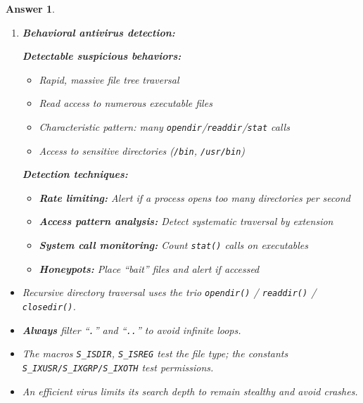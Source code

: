 \documentclass[a4paper,11pt]{article}
\theoremstyle{plain}
\newtheorem{correction}{Answer}
\theoremstyle{definition}
\begin{document}
\begin{correction}
\begin{enumerate}
\begin{lstlisting}[language=C]
        if (S_ISDIR(st.st_mode)) {
            // Increment depth for subdirectories
            search_targets(fullpath, ext, depth + 1, max_depth);
        } else if (S_ISREG(st.st_mode)) {
            char *e = strrchr(entry->d_name, '.');
            if (e && strcmp(e, ext) == 0) {
                printf("Target: %s\n", fullpath);
            }
        }
    }
    closedir(dir);
}

// Initial call with depth=0
search_targets("/home", ".c", 0, 3);  // Max 3 levels
\end{lstlisting}

\item \textbf{Behavioral antivirus detection:}

\textbf{Detectable suspicious behaviors:}
\begin{itemize}
\item Rapid, massive file tree traversal
\item Read access to numerous executable files
\item Characteristic pattern: many \texttt{opendir}/\texttt{readdir}/\texttt{stat} calls
\item Access to sensitive directories (\texttt{/bin}, \texttt{/usr/bin})
\end{itemize}

\textbf{Detection techniques:}
\begin{itemize}
\item \textbf{Rate limiting:} Alert if a process opens too many directories per second
\item \textbf{Access pattern analysis:} Detect systematic traversal by extension
\item \textbf{System call monitoring:} Count \texttt{stat()} calls on executables
\item \textbf{Honeypots:} Place ``bait'' files and alert if accessed
\end{itemize}

\end{enumerate}

\begin{pointcle}
\begin{itemize}
    \item Recursive directory traversal uses the trio \texttt{opendir()} / \texttt{readdir()} / \texttt{closedir()}.
    \item \textbf{Always} filter ``\texttt{.}'' and ``\texttt{..}'' to avoid infinite loops.
    \item The macros \texttt{S\_ISDIR}, \texttt{S\_ISREG} test the file \textit{type}; the constants \texttt{S\_IXUSR/S\_IXGRP/S\_IXOTH} test \textit{permissions}.
    \item An efficient virus limits its search depth to remain stealthy and avoid crashes.
\end{itemize}
\end{pointcle}

\end{correction}
\end{document}
